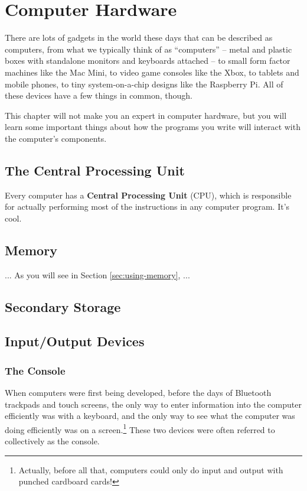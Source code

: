 
\chapter{Computer Hardware}

\minitoc

There are lots of gadgets in the world these days that can be described as computers, from what we typically think of as ``computers'' -- metal and plastic boxes with standalone monitors and keyboards attached -- to small form factor machines like the Mac Mini, to video game consoles like the Xbox, to tablets and mobile phones, to tiny system-on-a-chip designs like the Raspberry Pi.  All of these devices have a few things in common, though.

This chapter will not make you an expert in computer hardware, but you will learn some important things about how the programs you write will interact with the computer's components.

\section{The Central Processing Unit}

Every computer has a \textbf{Central Processing Unit} (CPU), which is responsible for actually performing most of the instructions in any computer program.  It's cool.

\section{Memory}

...  As you will see in Section \ref{sec:using-memory}, ...

\section{Secondary Storage}

\section{Input/Output Devices}

\subsection{The Console}
\label{subsection:console}

When computers were first being developed, before the days of Bluetooth trackpads and touch screens, the only way to enter information into the computer efficiently was with a keyboard, and the only way to see what the computer was doing efficiently was on a screen.\footnote{Actually, before all that, computers could only do input and output with punched cardboard cards!}  These two devices were often referred to collectively as the console.

